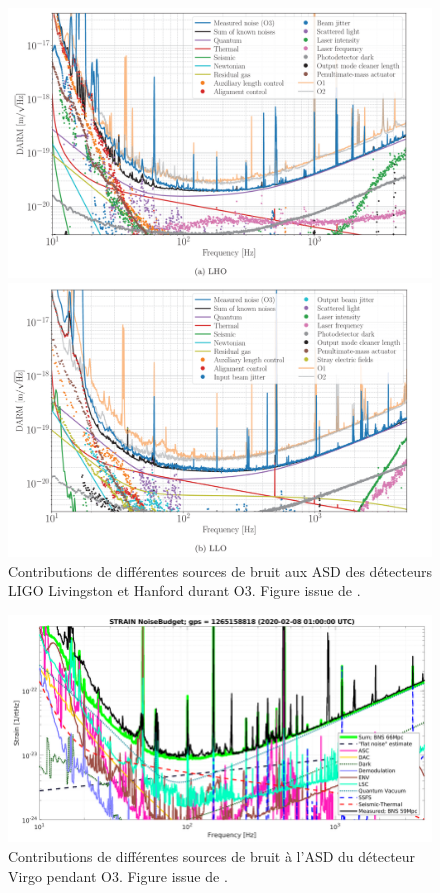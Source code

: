 \begin{figure}
  \centering
  \begin{minipage}{\linewidth}
    \centering
    \includegraphics[width=\linewidth]{sectionDetection/ligo_sensitivity_lho.png}
  \end{minipage}
  \begin{minipage}{\linewidth}
    \centering
    \includegraphics[width=\linewidth]{sectionDetection/ligo_sensitivity_llo.png}
  \end{minipage}
  \caption{Contributions de différentes sources de bruit aux ASD des détecteurs LIGO Livingston et Hanford durant O3. Figure issue de \cite{ligo_sensitivity}.}
  \label{fig:ligo_sensitivity}
\end{figure}


\begin{figure}
  \centering
  \includegraphics[width=0.7\linewidth]{sectionDetection/virgo_noise.png}
  \caption{Contributions de différentes sources de bruit à l'ASD du détecteur Virgo pendant O3. Figure issue de \cite{virgo_characterization}.}
  \label{fig:virgo_sensitivity}
\end{figure}


